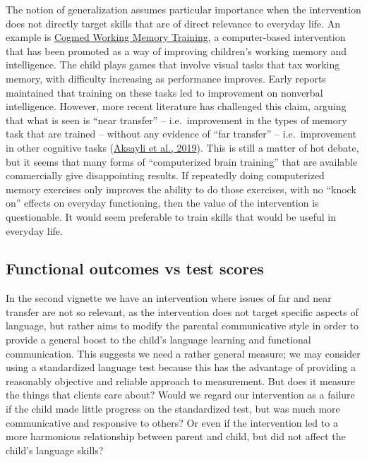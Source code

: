 \documentclass{krantz}
\begin{document}
The notion of generalization assumes particular importance when the intervention does not directly target skills that are of direct relevance to everyday life. An example is \href{https://www.cogmed.com/}{Cogmed Working Memory Training}, a computer-based intervention that has been promoted as a way of improving children's working memory and intelligence. The child plays games that involve visual tasks that tax working memory, with difficulty increasing as performance improves. Early reports maintained that training on these tasks led to improvement on nonverbal intelligence. However, more recent literature has challenged this claim, arguing that what is seen is ``near transfer'' -- i.e.~improvement in the types of memory task that are trained -- without any evidence of ``far transfer'' -- i.e.~improvement in other cognitive tasks (\protect\hyperlink{ref-aksayli2019}{Aksayli et al., 2019}). This is still a matter of hot debate, but it seems that many forms of ``computerized brain training'' that are available commercially give disappointing results. If repeatedly doing computerized memory exercises only improves the ability to do those exercises, with no ``knock on'' effects on everyday functioning, then the value of the intervention is questionable. It would seem preferable to train skills that would be useful in everyday life.

\hypertarget{functional-outcomes-vs-test-scores}{%
\subsection{Functional outcomes vs test scores}\label{functional-outcomes-vs-test-scores}}

In the second vignette we have an intervention where issues of far and near transfer are not so relevant, as the intervention does not target specific aspects of language, but rather aims to modify the parental communicative style in order to provide a general boost to the child's language learning and functional communication. This suggests we need a rather general measure; we may consider using a standardized language test because this has the advantage of providing a reasonably objective and reliable approach to measurement. But does it measure the things that clients care about? Would we regard our intervention as a failure if the child made little progress on the standardized test, but was much more communicative and responsive to others? Or even if the intervention led to a more harmonious relationship between parent and child, but did not affect the child's language skills?
\end{document}
